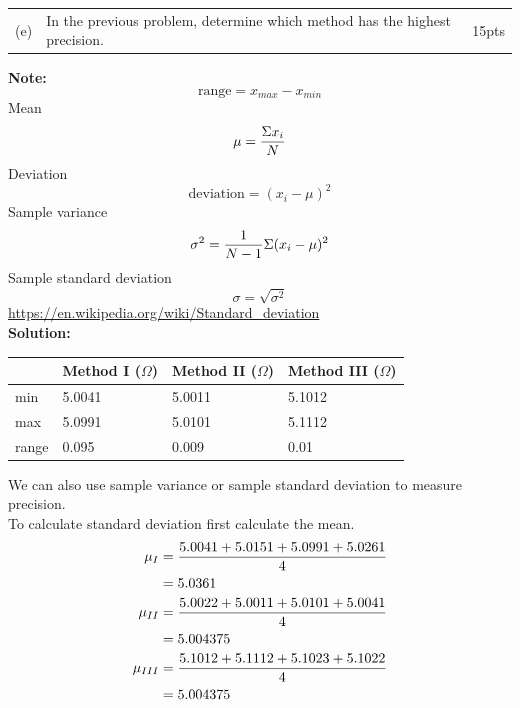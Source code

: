 \documentclass{article}
\newcommand{\problemstatement}[3]{
\noindent
\begin{tabular}{ m{0.5cm} m{42em} m{0.5cm} }
	({#1}) & {#2} & {#3}pts
\end{tabular}
}
\begin{document}
\newpage
\problemstatement{e}{In the previous problem, determine which method has the highest precision.}{15}
\begin{addmargin}[1.5cm]{0em}
	\noindent
	\textbf{Note:}
	\begin{equation}
		\text{range} = x_{max} - x_{min}
	\end{equation}
	Mean
	\begin{equation}
		\mu = {\Sigma x_i \over N}
	\end{equation}
	Deviation
	\begin{equation}
		\text{deviation} = (x_i - \mu)^2
	\end{equation}
	Sample variance
	\begin{equation}
		\sigma^2 = { 1 \over {N - 1}} \Sigma (x_i - \mu)^2
	\end{equation}
	Sample standard deviation
	\begin{equation}
		\sigma = \sqrt{\sigma^2}
	\end{equation}
	\url{https://en.wikipedia.org/wiki/Standard_deviation}\\
	\noindent
	\textbf{Solution:}
	\begin{center}
		\begin{tabular}{| w{c}{2cm} | w{c}{2cm} | w{c}{2cm} | w{c}{2cm} |}
			\hline
			& Method I ($\Omega$) & Method II ($\Omega$) & Method III ($\Omega$) \\ \hline
			min & 5.0041 & 5.0011 & 5.1012 \\ \hline
			max & 5.0991 & 5.0101 & 5.1112 \\ \hline
			range & 0.095 & 0.009 & 0.01 \\ \hline
		\end{tabular}
	\end{center}
	We can also use sample variance or sample standard deviation to measure precision. \\
	To calculate standard deviation first calculate the mean.
	\begin{align*}
		\mu_I &= { 5.0041 + 5.0151 + 5.0991 + 5.0261 \over 4}\\
		      &= 5.0361\\
		\mu_{II} &= { 5.0022 + 5.0011 + 5.0101 + 5.0041 \over 4}\\
		      &= 5.004375\\
		\mu_{III} &= { 5.1012 + 5.1112 + 5.1023 + 5.1022 \over 4}\\
		      &= 5.004375
	\end{align*}

\end{addmargin}
\end{document}
